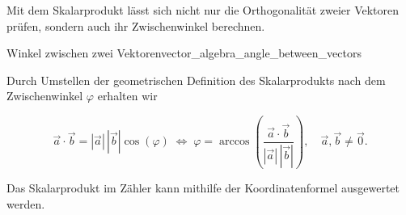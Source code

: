 Mit dem Skalarprodukt lässt sich nicht nur die Orthogonalität zweier Vektoren
prüfen, sondern auch ihr Zwischenwinkel berechnen.

\begin{KeyPointBox}{Winkel zwischen zwei Vektoren}{vector_algebra_angle_between_vectors}
  
    Durch Umstellen der geometrischen Definition des Skalarprodukts nach dem
    Zwischenwinkel $\varphi$ erhalten wir
    \par\smallskip\noindent
    \begin{minipage}[c]{0.72\linewidth}
      \[
        \vec a\cdot\vec b=|\vec a|\,|\vec b|\cos(\varphi)
        \;\Longleftrightarrow\;
        \varphi=\arccos\!\left(
          \frac{\vec a\cdot\vec b}{|\vec a|\,|\vec b|}
        \right),
        \quad \vec a,\vec b\ne\vec 0.
      \]
  \end{minipage}\hfill
  \begin{minipage}[c]{0.25\linewidth}
    \centering
  \end{minipage}
  \par\smallskip
  Das Skalarprodukt im Zähler kann mithilfe der Koordinatenformel
  ausgewertet werden.
\end{KeyPointBox}

